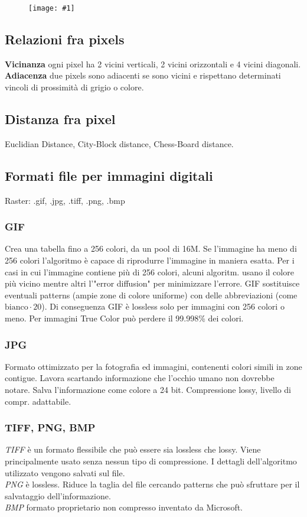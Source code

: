 \documentclass[8pt,a4paper]{article}
\newcommand{\f}[1]{
      \begin{figure}[H]
        \center
      \texttt{[image: \#1]}
      \end{figure}
}
\begin{document}
\begin{multicols}{5}
    \f{interpolation}

    \subsection{Relazioni fra pixels}
    \textbf{Vicinanza} ogni pixel ha 2 vicini verticali, 2 vicini orizzontali e 4 vicini
    diagonali. \\
    \textbf{Adiacenza} due pixels sono adiacenti se sono vicini e rispettano determinati
    vincoli di prossimità di grigio o colore.

    \subsection{Distanza fra pixel}
    Euclidian Distance, City-Block distance, Chess-Board distance.
    
    \subsection{Formati file per immagini digitali}
    Raster: .gif, .jpg, .tiff, .png, .bmp

    \subsubsection{GIF}
    Crea una tabella fino a 256 colori, da un pool di 16M. Se l'immagine ha meno di 256
    colori l'algoritmo è capace di riprodurre l'immagine in maniera esatta.
    Per i casi in cui l'immagine contiene più di 256 colori, alcuni algoritm. 
    usano il colore più vicino mentre altri l'"error diffusion" per minimizzare
    l'errore. GIF sostituisce eventuali patterns (ampie zone di colore uniforme)
    con delle abbreviazioni (come $\text{bianco} \cdot 20$). Di conseguenza
    GIF è lossless solo per immagini con 256 colori o meno. Per immagini
    True Color può perdere il 99.998\% dei colori.

    \subsubsection{JPG}
    Formato ottimizzato per la fotografia ed immagini, contenenti colori simili
    in zone contigue.
    Lavora scartando informazione che l'occhio umano non dovrebbe notare.
    Salva l'informazione come colore a 24 bit. Compressione lossy, livello di compr.
    adattabile.

    \subsubsection{TIFF, PNG, BMP}
    \textit{TIFF} è un formato flessibile che può essere sia lossless che lossy.
    Viene principalmente usato senza nessun tipo di compressione.
    I dettagli dell'algoritmo utilizzato vengono salvati sul file.
    \\
    \textit{PNG} è lossless. Riduce la taglia del file cercando patterns che può sfruttare
    per il salvataggio dell'informazione.\\
    \textit{BMP} formato proprietario non compresso inventato da Microsoft. \\


\end{multicols}
\end{document}
